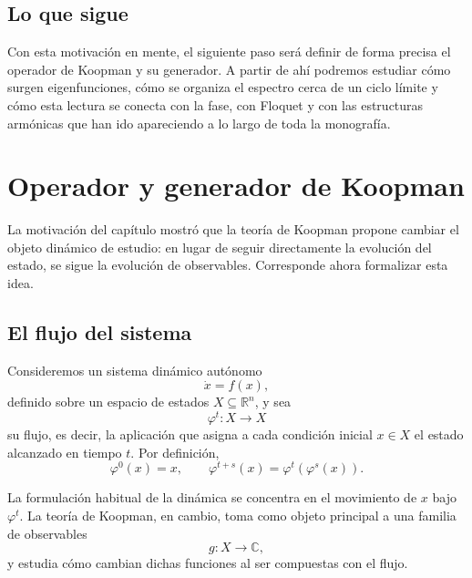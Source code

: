 \subsection{Lo que sigue}

Con esta motivación en mente, el siguiente paso será definir de forma precisa el operador de Koopman y su generador. A partir de ahí podremos estudiar cómo surgen eigenfunciones, cómo se organiza el espectro cerca de un ciclo límite y cómo esta lectura se conecta con la fase, con Floquet y con las estructuras armónicas que han ido apareciendo a lo largo de toda la monografía.

\section{Operador y generador de Koopman}

La motivación del capítulo mostró que la teoría de Koopman propone cambiar el objeto dinámico de estudio: en lugar de seguir directamente la evolución del estado, se sigue la evolución de observables. Corresponde ahora formalizar esta idea.

\subsection{El flujo del sistema}

Consideremos un sistema dinámico autónomo
\begin{equation}
\dot{x}=f(x),
\label{eq:Koopman_operator_system}
\end{equation}
definido sobre un espacio de estados \(X\subseteq\mathbb{R}^n\), y sea
\begin{equation}
\varphi^t:X\to X
\label{eq:Koopman_operator_flow}
\end{equation}
su flujo, es decir, la aplicación que asigna a cada condición inicial \(x\in X\) el estado alcanzado en tiempo \(t\). Por definición,
\begin{equation}
\varphi^0(x)=x,
\qquad
\varphi^{t+s}(x)=\varphi^t(\varphi^s(x)).
\label{eq:Koopman_operator_semigroup_flow}
\end{equation}

La formulación habitual de la dinámica se concentra en el movimiento de \(x\) bajo \(\varphi^t\). La teoría de Koopman, en cambio, toma como objeto principal a una familia de observables
\begin{equation}
g:X\to\mathbb{C},
\label{eq:Koopman_operator_observable}
\end{equation}
y estudia cómo cambian dichas funciones al ser compuestas con el flujo.

